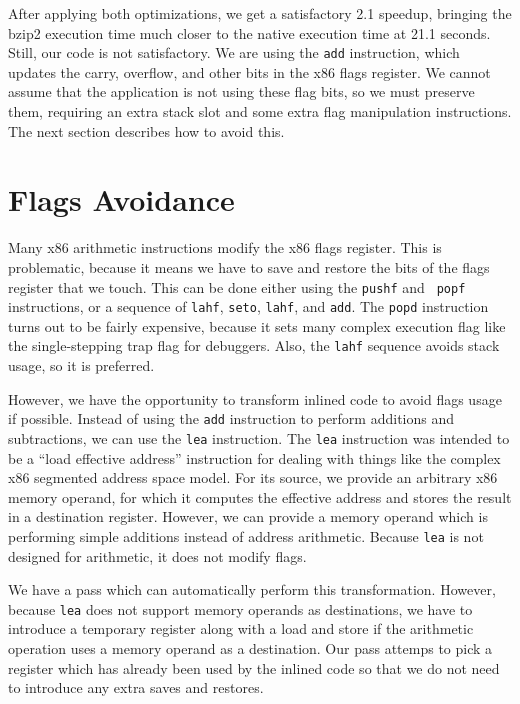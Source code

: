 After applying both optimizations, we get a satisfactory 2.1 speedup, bringing
the bzip2 execution time much closer to the native execution time at 21.1
seconds.  Still, our code is not satisfactory.  We are using the {\tt add}
instruction, which updates the carry, overflow, and other bits in the x86 flags
register.  We cannot assume that the application is not using these flag bits,
so we must preserve them, requiring an extra stack slot and some extra flag
manipulation instructions.  The next section describes how to avoid this.

\section{Flags Avoidance}

Many x86 arithmetic instructions modify the x86 flags register.  This is
problematic, because it means we have to save and restore the bits of the flags
register that we touch.  This can be done either using the {\tt pushf} and {\tt
popf} instructions, or a sequence of {\tt lahf}, {\tt seto}, {\tt lahf}, and
{\tt add}.  The {\tt popd} instruction turns out to be fairly expensive, because
it sets many complex execution flag like the single-stepping trap flag for
debuggers.  Also, the {\tt lahf} sequence avoids stack usage, so it is
preferred.

However, we have the opportunity to transform inlined code to avoid flags usage
if possible.  Instead of using the {\tt add} instruction to perform additions
and subtractions, we can use the {\tt lea} instruction.  The {\tt lea}
instruction was intended to be a ``load effective address'' instruction for
dealing with things like the complex x86 segmented address space model.  For its
source, we provide an arbitrary x86 memory operand, for which it computes the
effective address and stores the result in a destination register.  However, we
can provide a memory operand which is performing simple additions instead of
address arithmetic.  Because {\tt lea} is not designed for arithmetic, it does
not modify flags.

We have a pass which can automatically perform this transformation.  However,
because {\tt lea} does not support memory operands as destinations, we have to
introduce a temporary register along with a load and store if the arithmetic
operation uses a memory operand as a destination.  Our pass attemps to pick a
register which has already been used by the inlined code so that we do not need
to introduce any extra saves and restores.

